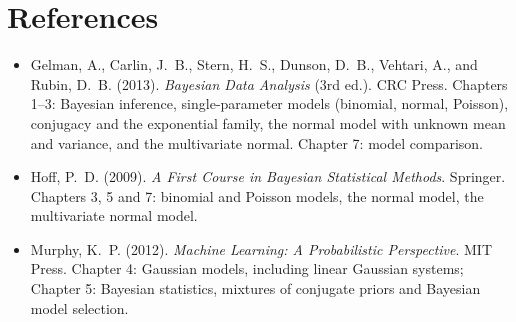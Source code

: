 \section*{References}
\begin{itemize}
\item Gelman, A., Carlin, J.~B., Stern, H.~S., Dunson, D.~B., Vehtari, A., and Rubin, D.~B. (2013). \emph{Bayesian Data Analysis} (3rd ed.). CRC Press. Chapters 1--3: Bayesian inference, single-parameter models (binomial, normal, Poisson), conjugacy and the exponential family, the normal model with unknown mean and variance, and the multivariate normal. Chapter 7: model comparison.
\item Hoff, P.~D. (2009). \emph{A First Course in Bayesian Statistical Methods}. Springer. Chapters 3, 5 and 7: binomial and Poisson models, the normal model, the multivariate normal model.
\item Murphy, K.~P. (2012). \emph{Machine Learning: A Probabilistic Perspective}. MIT Press. Chapter 4: Gaussian models, including linear Gaussian systems; Chapter 5: Bayesian statistics, mixtures of conjugate priors and Bayesian model selection.
\end{itemize}


